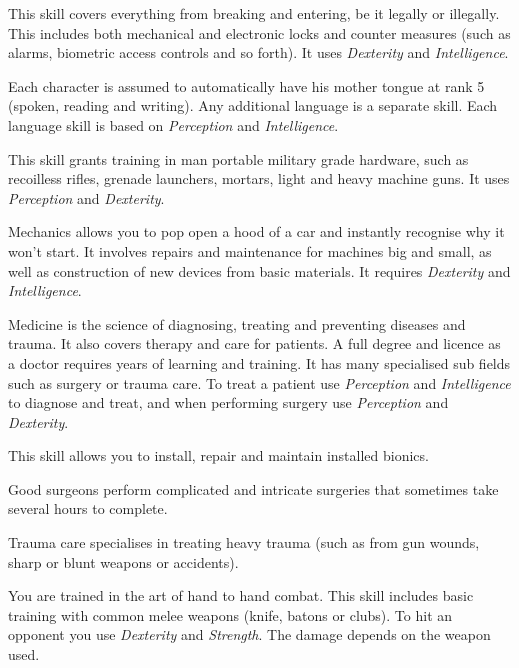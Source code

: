\begin{description}
   This skill covers everything from breaking and entering, be
  it legally or illegally. This includes both mechanical and electronic locks and counter measures (such as alarms, biometric access controls and so forth). It
  uses \emph{Dexterity} and \emph{Intelligence}.

   Each character is assumed to automatically have his mother
  tongue at rank 5 (spoken, reading and writing). Any additional language is a
  separate skill. Each language skill is based on \emph{Perception} and
  \emph{Intelligence}.

   This skill grants training in man portable military
  grade hardware, such as recoilless rifles, grenade launchers, mortars, light
  and heavy machine guns. It uses \emph{Perception} and \emph{Dexterity}.

   Mechanics allows you to pop open a hood of a car and instantly recognise why it won't start. It involves repairs and maintenance for machines
  big and small, as well as construction of new devices from basic materials. It
  requires \emph{Dexterity} and \emph{Intelligence}.

   Medicine is the science of diagnosing, treating and
  preventing diseases and trauma. It also covers therapy and care for patients.
  A full degree and licence as a doctor requires years of learning and training.
  It has many specialised sub fields such as surgery or trauma care. To treat a
  patient use \emph{Perception} and \emph{Intelligence} to diagnose and treat,
  and when performing surgery use \emph{Perception} and \emph{Dexterity}.

   This skill allows you to install, repair and maintain installed bionics.

   Good surgeons perform complicated and
  intricate surgeries that sometimes take several hours to complete.

   Trauma care specialises in treating
  heavy trauma (such as from gun wounds, sharp or blunt weapons or accidents).

   You are trained in the art of hand to hand combat. This
  skill includes basic training with common melee weapons (knife, batons or
  clubs). To hit an opponent you use \emph{Dexterity} and \emph{Strength}.
  The damage depends on the weapon used.


\end{description}
